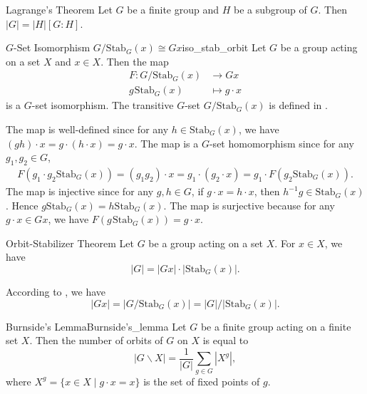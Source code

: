 \begin{theorem}{Lagrange's Theorem}{}
    Let $G$ be a finite group and $H$ be a subgroup of $G$. Then $|G|=|H|[G:H]$.
\end{theorem}


\begin{proposition}{$G$-Set Isomorphism $G/\mathrm{Stab}_G(x)\cong Gx$}{iso_stab_orbit}
    Let $G$ be a group acting on a set $X$ and $x\in X$. Then the map
    \begin{align*}
        F:G/\mathrm{Stab}_G(x)          & \longrightarrow Gx   \\
        g\hspace{1pt}\mathrm{Stab}_G(x) & \longmapsto g\cdot x
    \end{align*}
    is a $G$-set isomorphism. The transitive $G$-set $G/\mathrm{Stab}_G(x)$ is defined in .
\end{proposition}
\begin{prf}
    The map is well-defined since for any $h\in \mathrm{Stab}_G(x)$, we have $(gh)\cdot x=g\cdot (h\cdot x)=g\cdot x$. The map is a $G$-set homomorphism since for any $g_1,g_2\in G$,
    \begin{align*}
        F\left(g_1\cdot g_2\mathrm{Stab}_G(x)\right)=(g_1g_2)\cdot x=g_1\cdot(g_2\cdot x)=g_1\cdot F\left(g_2\mathrm{Stab}_G(x)\right).
    \end{align*}
    The map is injective since for any $g,h\in G$, if $g\cdot x=h\cdot x$, then $h^{-1}g\in \mathrm{Stab}_G(x)$. Hence $g\mathrm{Stab}_G(x)=h\mathrm{Stab}_G(x)$. The map is surjective because for any $g\cdot x\in Gx$, we have $F\left(g\hspace{1pt}\mathrm{Stab}_G(x)\right)=g\cdot x$.
\end{prf}

\begin{theorem}{Orbit-Stabilizer Theorem}{}
    Let $G$ be a group acting on a set $X$. For $x\in X$, we have
    \[
        |G|=|Gx|\cdot |\mathrm{Stab}_G(x)|    .
    \]
\end{theorem}

\begin{prf}
    According to , we have
    \[
        \left|Gx\right|=\left|G/\mathrm{Stab}_G(x)\right|=|G|/\left|\mathrm{Stab}_G(x)\right|.
    \]
\end{prf}

\begin{theorem}{Burnside's Lemma}{Burnside's_lemma}
    Let $G$ be a finite group acting on a finite set $X$. Then the number of orbits of $G$ on $X$ is equal to
    \[
        |G\backslash X|=\frac{1}{|G|}\sum_{g\in G}|X^g|    ,
    \]
    where $X^g=\{x\in X\mid g\cdot x=x\}$ is the set of fixed points of $g$.
\end{theorem}

